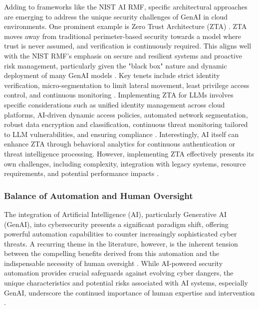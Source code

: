 Adding to frameworks like the NIST AI RMF, specific architectural approaches are emerging to address the unique security challenges of GenAI in cloud environments. One prominent example is Zero Trust Architecture (ZTA) \cite{noauthor_zero-trust_nodate}. ZTA moves away from traditional perimeter-based security towards a model where trust is never assumed, and verification is continuously required\cite{noauthor_zero-trust_nodate}. This aligns well with the NIST RMF's emphasis on secure and resilient systems and proactive risk management, particularly given the "black box" nature and dynamic deployment of many GenAI models \cite{noauthor_zero-trust_nodate, tabassi_artificial_2023}. Key tenets include strict identity verification, micro-segmentation to limit lateral movement, least privilege access control, and continuous monitoring \cite{noauthor_zero-trust_nodate}. Implementing ZTA for LLMs involves specific considerations such as unified identity management across cloud platforms, AI-driven dynamic access policies, automated network segmentation, robust data encryption and classification, continuous threat monitoring tailored to LLM vulnerabilities, and ensuring compliance \cite{noauthor_zero-trust_nodate}. Interestingly, AI itself can enhance ZTA through behavioral analytics for continuous authentication or threat intelligence processing\cite{noauthor_zero-trust_nodate}. However, implementing ZTA effectively presents its own challenges, including complexity, integration with legacy systems, resource requirements, and potential performance impacts \cite{noauthor_zero-trust_nodate}.

\subsubsection{Balance of Automation and Human Oversight} %
\label{sec:Balance of Automation and Human Oversight}

The integration of Artificial Intelligence (AI), particularly Generative AI (GenAI), into cybersecurity presents a significant paradigm shift, offering powerful automation capabilities to counter increasingly sophisticated cyber threats. A recurring theme in the literature, however, is the inherent tension between the compelling benefits derived from this automation and the indispensable necessity of human oversight \cite{seth_ai_2025}. While AI-powered security automation provides crucial safeguards against evolving cyber dangers, the unique characteristics and potential risks associated with AI systems, especially GenAI, underscore the continued importance of human expertise and intervention \cite{seth_ai_2025, patel_generative_2025}.


